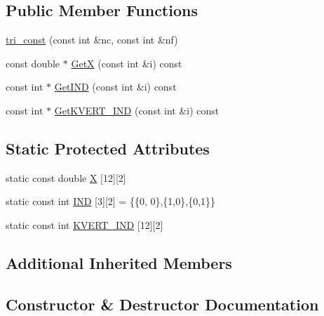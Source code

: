 \subsection*{Public Member Functions}
\begin{DoxyCompactItemize}
\item 
\mbox{\hyperlink{classfemus_1_1tri__const_ac5a45dda939767a542d5bdbc64feb9a6}{tri\+\_\+const}} (const int \&nc, const int \&nf)
\item 
const double $\ast$ \mbox{\hyperlink{classfemus_1_1tri__const_ac085b6cf3dbfcb6a3cd06337c06fd06f}{GetX}} (const int \&i) const
\item 
const int $\ast$ \mbox{\hyperlink{classfemus_1_1tri__const_a8acedcfc88051ca62d624106f0d78363}{Get\+I\+ND}} (const int \&i) const
\item 
const int $\ast$ \mbox{\hyperlink{classfemus_1_1tri__const_a3fd58ad3e2cc9c37e4a92fcab3b11a20}{Get\+K\+V\+E\+R\+T\+\_\+\+I\+ND}} (const int \&i) const
\end{DoxyCompactItemize}
\subsection*{Static Protected Attributes}
\begin{DoxyCompactItemize}
\item 
static const double \mbox{\hyperlink{classfemus_1_1tri__const_abfe45c8c83921a5fc439a70b3f30aa10}{X}} \mbox{[}12\mbox{]}\mbox{[}2\mbox{]}
\item 
static const int \mbox{\hyperlink{classfemus_1_1tri__const_ad25726ae5b78e8f7171061f8208e0cb5}{I\+ND}} \mbox{[}3\mbox{]}\mbox{[}2\mbox{]} = \{\{0, 0\},\{1,0\},\{0,1\}\}
\item 
static const int \mbox{\hyperlink{classfemus_1_1tri__const_a89409e358f8f50f1be7a66af2bfca7f0}{K\+V\+E\+R\+T\+\_\+\+I\+ND}} \mbox{[}12\mbox{]}\mbox{[}2\mbox{]}
\end{DoxyCompactItemize}
\subsection*{Additional Inherited Members}


\subsection{Constructor \& Destructor Documentation}
\mbox{\label{classfemus_1_1tri__const_ac5a45dda939767a542d5bdbc64feb9a6}} 
